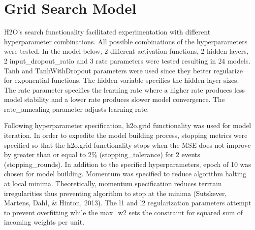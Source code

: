 \documentclass[12pt,twoside]{amherstthesis}
\begin{document}
  \begin{Shaded}
  \begin{Highlighting}[]
  \StringTok{ }\NormalTok{(}
  \NormalTok{)}
  \end{Highlighting}
  \end{Shaded}
  
  \section{Grid Search Model}\label{grid-search-model}
  
  H2O's search functionality facilitated experimentation with different
  hyperparameter combinations. All possible combinations of the
  hyperparameters were tested. In the model below, 2 different activation
  functions, 2 hidden layers, 2 input\_dropout\_ratio and 3 rate
  parameters were tested resulting in 24 models. Tanh and TanhWithDropout
  parameters were used since they better regularize for exponential
  functions. The hidden variable specifies the hidden layer sizes. The
  rate parameter specifies the learning rate where a higher rate produces
  less model stability and a lower rate produces slower model convergence.
  The rate\_annealing parameter adjusts learning rate.
  
  \begin{Shaded}
  \begin{Highlighting}[]
  \StringTok{ }\NormalTok{(}
    \NormalTok{(}\NormalTok{, }\NormalTok{),}
    \NormalTok{(}\NormalTok{(}\NormalTok{,}\NormalTok{),}\NormalTok{(}\NormalTok{,}\NormalTok{)),}
    \NormalTok{(}\NormalTok{,}\NormalTok{),}
    \NormalTok{(}\NormalTok{,}\NormalTok{,}\NormalTok{)}
  \NormalTok{)}
  \end{Highlighting}
  \end{Shaded}
  
  Following hyperparameter specification, h2o.grid functionality was used
  for model iteration. In order to expedite the model building process,
  stopping metrics were specified so that the h2o.grid functionality stops
  when the MSE does not improve by greater than or equal to 2\%
  (stopping\_tolerance) for 2 events (stopping\_rounds). In addition to
  the specified hyperparameters, epoch of 10 was chosen for model
  building. Momentum was specified to reduce algorithm halting at local
  minima. Theoretically, momentum specification reduces terrrain
  irregularities thus preventing algorithm to stop at the minima
  (Sutskever, Martens, Dahl, \& Hinton, 2013). The l1 and l2
  regularization parameters attempt to prevent overfitting while the
  max\_w2 sets the constraint for squared sum of incoming weights per
  unit.
  
\end{document}
